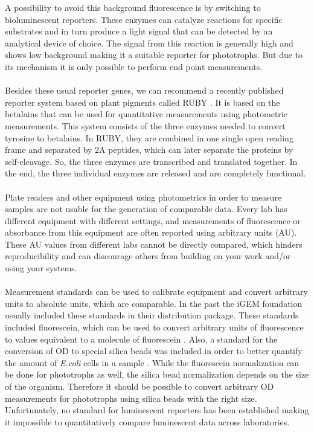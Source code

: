 \FloatBarrier
\noindent
A possibility to avoid this background fluorescence is by switching to bioluminescent reporters. These enzymes can catalyze reactions for specific substrates and in turn produce a light signal that can be detected by an analytical device of choice. The signal from this reaction is generally high and shows low background making it a suitable reporter for phototrophs. But due to its mechanism it is only possible to perform end point measurements.
\\ \\
Besides these usual reporter genes, we can recommend a recently published reporter system based on plant pigments called RUBY \parencite{He2020}. It is based on the betalains that can be used for quantitative measurements using photometric measurements. This system consists of the three enzymes needed to convert tyrosine to betalains. In RUBY, they are combined in one single open reading frame and separated by 2A peptides, which can later separate the proteins by self-cleavage. So, the three enzymes are transcribed and translated together. In the end, the three individual enzymes are released and are completely functional. 
\\ \\
Plate readers and other equipment using photometrics in order to measure samples are not usable for the generation of comparable data. Every lab has different equipment with different settings, and measurements of fluorescence or absorbance from this equipment are often reported using arbitrary units (AU). These AU values from different labs cannot be directly compared, which hinders reproducibility and can discourage others from building on your work and/or using your systems.
\\ \\
Measurement standards can be used to calibrate equipment and convert arbitrary units to absolute units, which are comparable. In the past the iGEM foundation usually included these standards in their distribution package. These standards included fluorescein, which can be used to convert arbitrary units of fluorescence to values equivalent to a molecule of fluorescein \parencite{Beal2018}. Also, a standard for the conversion of OD to special silica beads was included in order to better quantify the amount of \textit{E.coli} cells in a sample \parencite{Beal2020}. While the fluorescein normalization can be done for phototrophs as well, the silica bead normalization depends on the size of the organism. Therefore it should be possible to convert arbitrary OD measurements for phototrophs using silica beads with the right size. Unfortunately, no standard for luminescent reporters has been established making it impossible to quantitatively compare luminescent data across laboratories.




